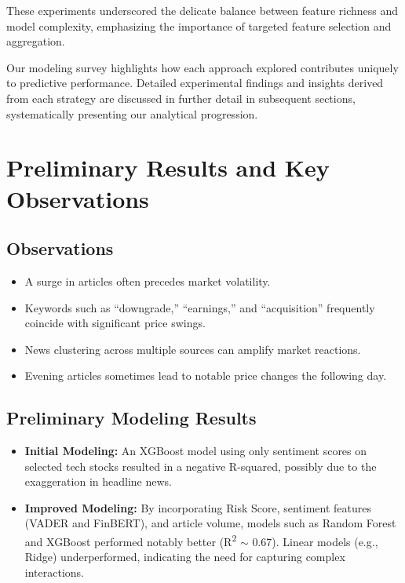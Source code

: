 \documentclass[twocolumn]{article}
\begin{document}
These experiments underscored the delicate balance between feature richness and model complexity, emphasizing the importance of targeted feature selection and aggregation.

Our modeling survey highlights how each approach explored contributes uniquely to predictive performance. Detailed experimental findings and insights derived from each strategy are discussed in further detail in subsequent sections, systematically presenting our analytical progression.

\section{Preliminary Results and Key Observations}
\subsection{Observations}
\begin{itemize}
    \item A surge in articles often precedes market volatility.
    \item Keywords such as ``downgrade,'' ``earnings,'' and ``acquisition'' frequently coincide with significant price swings.
    \item News clustering across multiple sources can amplify market reactions.
    \item Evening articles sometimes lead to notable price changes the following day.
\end{itemize}

\subsection{Preliminary Modeling Results}
\begin{itemize}
    \item \textbf{Initial Modeling:} An XGBoost model using only sentiment scores on selected tech stocks resulted in a negative R-squared, possibly due to the exaggeration in headline news.
    \item \textbf{Improved Modeling:} By incorporating Risk Score, sentiment features (VADER and FinBERT), and article volume, models such as Random Forest and XGBoost performed notably better (R\textsuperscript{2} $\sim$ 0.67). Linear models (e.g., Ridge) underperformed, indicating the need for capturing complex interactions.
\end{itemize}

\end{document}
